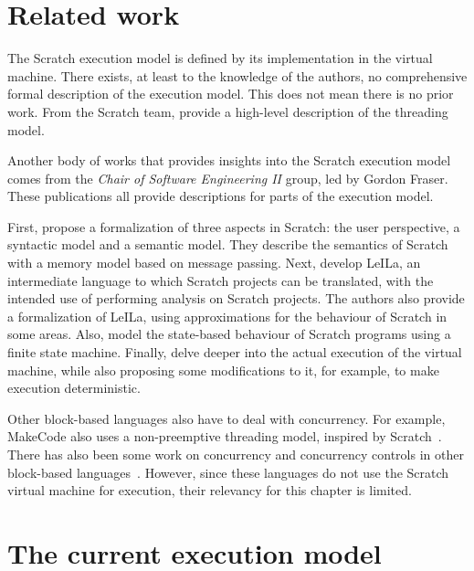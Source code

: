 \documentclass[../main]{subfiles}
\begin{document}
\section{Related work}\label{sec:execution-related-work}

The Scratch execution model is defined by its implementation in the virtual machine.
There exists, at least to the knowledge of the authors, no comprehensive formal description of the execution model.
This does not mean there is no prior work.
From the Scratch team, \textcite{maloneyScratchProgrammingLanguage2010} provide a high-level description of the threading model.

Another body of works that provides insights into the Scratch execution model comes from the \emph{Chair of Software Engineering II} group, led by Gordon Fraser.
These publications all provide descriptions for parts of the execution model.

First, \textcite{stahlbauerTestingScratchPrograms2019} propose a formalization of three aspects in Scratch: the user perspective, a syntactic model and a semantic model.
They describe the semantics of Scratch with a memory model based on message passing.
Next, \textcite{stahlbauerVerifiedScratchProgram2020} develop LeILa, an intermediate language to which Scratch projects can be translated, with the intended use of performing analysis on Scratch projects.
The authors also provide a formalization of LeILa, using approximations for the behaviour of Scratch in some areas.
Also, \textcite{gotzModelbasedTestingScratch2022} model the state-based behaviour of Scratch programs using a finite state machine.
Finally, \textcite{deinerAutomatedTestGeneration2023} delve deeper into the actual execution of the virtual machine, while also proposing some modifications to it, for example, to make execution deterministic.

Other block-based languages also have to deal with concurrency.
For example, MakeCode also uses a non-preemptive threading model, inspired by Scratch~\autocite{ballMicrosoftMakeCodeEmbedded2019}.
There has also been some work on concurrency and concurrency controls in other block-based languages~\autocite{chungConCodeItComparisonConcurrency2020}.
However, since these languages do not use the Scratch virtual machine for execution, their relevancy for this chapter is limited.

\section{The current execution model}\label{sec:the-current-execution-model}
\end{document}
